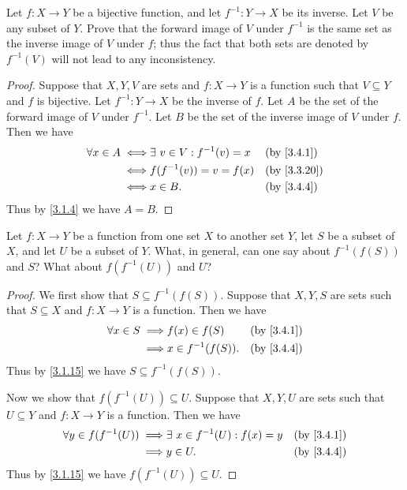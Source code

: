 \exercisesection

\begin{ex}\label{ex:3.4.1}
  Let \(f : X \to Y\) be a bijective function, and let \(f^{-1} : Y \to X\) be its inverse.
  Let \(V\) be any subset of \(Y\).
  Prove that the forward image of \(V\) under \(f^{-1}\) is the same set as the inverse image of \(V\) under \(f\);
  thus the fact that both sets are denoted by \(f^{-1}(V)\) will not lead to any inconsistency.
\end{ex}

\begin{proof}
  Suppose that \(X, Y, V\) are sets and \(f : X \to Y\) is a function such that \(V \subseteq Y\) and \(f\) is bijective.
  Let \(f^{-1} : Y \to X\) be the inverse of \(f\).
  Let \(A\) be the set of the forward image of \(V\) under \(f^{-1}\).
  Let \(B\) be the set of the inverse image of \(V\) under \(f\).
  Then we have
  \begin{align*}
    \forall x \in A \iff & \exists\ v \in V : f^{-1}(v) = x &  & \by{3.4.1}                \\
    \iff                 & f(f^{-1}(v)) = v = f(x)          &  & \text{(by \cref{3.3.20})} \\
    \iff                 & x \in B.                         &  & \by{3.4.4}
  \end{align*}
  Thus by \cref{3.1.4} we have \(A = B\).
\end{proof}

\begin{ex}\label{ex:3.4.2}
  Let \(f : X \to Y\) be a function from one set \(X\) to another set \(Y\), let \(S\) be a subset of \(X\), and let \(U\) be a subset of \(Y\).
  What, in general, can one say about \(f^{-1}(f(S))\) and \(S\)?
  What about \(f(f^{-1}(U))\) and \(U\)?
\end{ex}

\begin{proof}
  We first show that \(S \subseteq f^{-1}(f(S))\).
  Suppose that \(X, Y, S\) are sets such that \(S \subseteq X\) and \(f : X \to Y\) is a function.
  Then we have
  \begin{align*}
    \forall x \in S \implies & f(x) \in f(S)       &  & \by{3.4.1} \\
    \implies                 & x \in f^{-1}(f(S)). &  & \by{3.4.4}
  \end{align*}
  Thus by \cref{3.1.15} we have \(S \subseteq f^{-1}(f(S))\).

  Now we show that \(f(f^{-1}(U)) \subseteq U\).
  Suppose that \(X, Y, U\) are sets such that \(U \subseteq Y\) and \(f : X \to Y\) is a function.
  Then we have
  \begin{align*}
    \forall y \in f(f^{-1}(U)) \implies & \exists\ x \in f^{-1}(U) : f(x) = y &  & \by{3.4.1} \\
    \implies                            & y \in U.                            &  & \by{3.4.4}
  \end{align*}
  Thus by \cref{3.1.15} we have \(f(f^{-1}(U)) \subseteq U\).
\end{proof}

